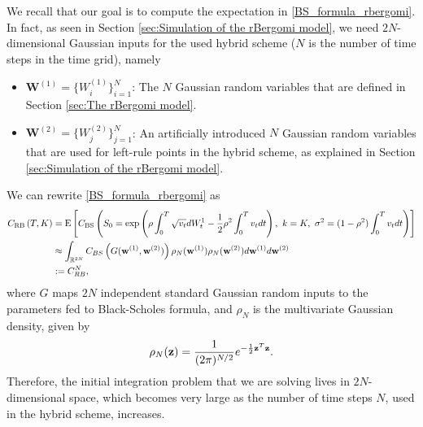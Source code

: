 We recall that our goal is to compute the expectation in \eqref{BS_formula_rbergomi}. In fact, as seen in Section \ref{sec:Simulation of the rBergomi model}, we need   $2N$-dimensional Gaussian inputs for the used  hybrid  scheme ($N$ is the number of time steps in  the time grid), namely
\begin{itemize}
	\item $\mathbf{W}^{(1)}=\{W^{(1)}_i\}_{i=1}^N$: The $N$ Gaussian random variables that are defined in Section  \ref{sec:The rBergomi model}.
	\item $\mathbf{W}^{(2)}=\{W^{(2)}_j\}_{j=1}^N$: An artificially introduced $N$ Gaussian random variables that are used for left-rule points in the hybrid scheme, as explained in Section  \ref{sec:Simulation of the rBergomi model}.
\end{itemize}
We can rewrite \eqref{BS_formula_rbergomi} as 
\begin{align}\label{BS_formula_rbergomi_2}
C_{\text{RB}}\left( T, K \right)&=\text{E}\left[C_{\text{BS}}\left( S_0 = \operatorname{exp}\left(\rho \int_0^T \sqrt{v_t} dW_t^1 - \frac{1}{2}
\rho^2 \int_0^T v_t dt\right),\ k = K, \ \sigma^2 = (1-\rho^2)
\int_0^T v_t dt \right) \right] \nonumber \\
&\approx \int_{\mathbb{R}^{2N}} C_{BS} \left(G(\mathbf{w}^{(1)},\mathbf{w}^{(2)})\right) \rho_{N}(\mathbf{w}^{(1)})  \rho_{N}(\mathbf{w}^{(2)}) d\mathbf{w}^{(1)} d\mathbf{w}^{(2)} \nonumber \\
&:=C_{RB}^{N},
\end{align}
where $G$  maps  $2N$ independent standard Gaussian random inputs to the parameters fed to Black-Scholes formula, and  $\rho_N$ is the multivariate Gaussian density, given by 
\begin{equation*}\label{eq: multivariate gaussian distribution}
\rho_N(\mathbf{z})=\frac{1}{(2 \pi)^{N/2}} e^{-\frac{1}{2} \mathbf{z}^T \mathbf{z}} .
\end{equation*} 
Therefore, the initial integration problem that we are solving lives in $2N$-dimensional space, which becomes very large as the number of time steps $N$, used in the hybrid scheme, increases.

